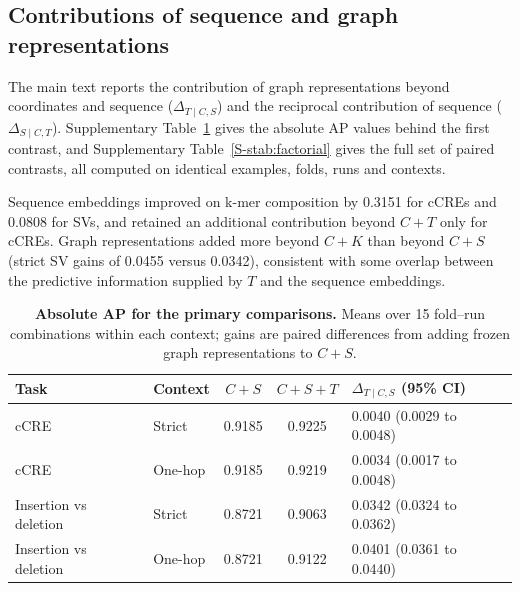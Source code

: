 \documentclass[11pt]{article}
\begin{document}
\begin{bibunit}[unsrtnat]
\section{Contributions of sequence and graph representations}
\label{S-snote:contrasts}

The main text reports the contribution of graph representations beyond coordinates and sequence ($\Delta_{T\mid C,S}$) and the reciprocal contribution of sequence ($\Delta_{S\mid C,T}$). Supplementary Table~\ref{S-stab:primary} gives the absolute AP values behind the first contrast, and Supplementary Table~\ref{S-stab:factorial} gives the full set of paired contrasts, all computed on identical examples, folds, runs and contexts.

Sequence embeddings improved on k-mer composition by 0.3151 for cCREs and 0.0808 for SVs, and retained an additional contribution beyond $C+T$ only for cCREs. Graph representations added more beyond $C+K$ than beyond $C+S$ (strict SV gains of 0.0455 versus 0.0342), consistent with some overlap between the predictive information supplied by $T$ and the sequence embeddings.

\begin{table}[H]
\centering
\caption{\textbf{Absolute AP for the primary comparisons.} Means over 15 fold--run combinations within each context; gains are paired differences from adding frozen graph representations to $C+S$.}
\label{S-stab:primary}
\small
\begin{tabular}{@{}llccl@{}}
\toprule
Task & Context & $C+S$ & $C+S+T$ & $\Delta_{T\mid C,S}$ (95\% CI) \\
\midrule
cCRE & Strict & 0.9185 & 0.9225 & 0.0040 (0.0029 to 0.0048) \\
cCRE & One-hop & 0.9185 & 0.9219 & 0.0034 (0.0017 to 0.0048) \\
Insertion vs deletion & Strict & 0.8721 & 0.9063 & 0.0342 (0.0324 to 0.0362) \\
Insertion vs deletion & One-hop & 0.8721 & 0.9122 & 0.0401 (0.0361 to 0.0440) \\
\bottomrule
\end{tabular}
\end{table}


\end{bibunit}
\end{document}
